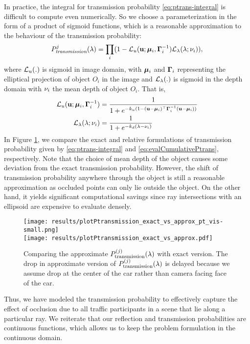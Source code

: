 In practice, the integral for transmission probability \eqref{eq:ptrans-integral} is difficult to compute even numerically. So we choose a parameterization in the form of a product of sigmoid functions, which is a reasonable approximation to the behaviour of the transmission probability:
%
\newcommand{\Ptransmission}{P_{\textit{transmission}}}%
\begin{align}
  \Ptransmission^j(\lambda) = \prod_i (1 - \cL_u (\bu; \bmu_i, \bGamma_i^{-1}) \cL_{\lambda}(\lambda; \meandepth{i})),
\label{eq:evalCumulativePtrans}
\end{align}
%
where $\mathcal{L}_u(.)$ is sigmoid in image domain, with ${\bm{\mu}}_i$ and $\bm{\Gamma}_i$ representing the elliptical projection of object $O_i$ in the image and $\mathcal{L}_{\lambda}(.)$ is sigmoid in the depth domain with $\nu_i$ the mean depth of object $O_i$. That is,
%
\begin{align}
\mathcal{L}_u(\mathbf{u}; {\bm{\mu}}_i, \bm{\Gamma}_i^{-1}) &= \frac{1}{1 + e^{-k_u(1 - (\mathbf{u} - {\bm{\mu}}_i)^\top \bm{\Gamma}_i^{-1} (\mathbf{u} - {\bm{\mu}}_i))}} \\
  \mathcal{L}_{\lambda}(\lambda; \nu_i) &= \frac{1}{1 + e^{-k_d(\lambda - \nu_i)}}
\end{align}
%
In Figure \ref{fig:compare:exact:approx:ptrans}, we compare the exact and relative formulations of transmission probability given by \eqref{eq:ptrans-integral} and \eqref{eq:evalCumulativePtrans}, respectively. Note that the choice of mean depth of the object causes some deviation from the exact transmission probability. However, the shift of transmission probability anywhere through the object is still a reasonable approximation as occluded points can only lie outside the object. On the other hand, it yields significant computational savings since ray intersections with an ellipsoid are expensive to evaluate densely.


\begin{figure}
  \texttt{[image: results/plotPtransmission\_exact\_vs\_approx\_pt\_vis-small.png]}\\
  \texttt{[image: results/plotPtransmission\_exact\_vs\_approx.pdf]}
  \caption{Comparing the approximate $P^{(j)}_{\text{transmission}}(\lambda)$ with exact version. The drop in approximate version of $P^{(j)}_{\text{transmission}}(\lambda)$ is delayed because we assume drop at the center of the car rather than camera facing face of the car.}
  \label{fig:compare:exact:approx:ptrans}
\end{figure}

Thus, we have modeled the transmission probability to effectively capture the effect of occlusion due to all traffic participants in a scene that lie along a particular ray. We reiterate that our reflection and transmission probabilities are continuous functions, which allows us to keep the problem formulation in the continuous domain.
